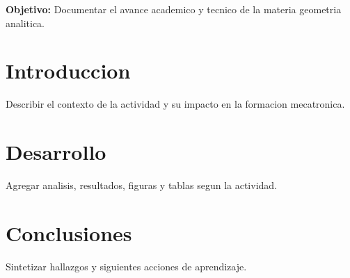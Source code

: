 \documentclass[spanish,letterpaper,oneside]{article}
\begin{document}
\templatePortrait
\templatePagecfg
\onehalfspacing

\begin{abstractd}
\textbf{Objetivo:} Documentar el avance academico y tecnico de la materia geometria analitica.
\end{abstractd}

\templateIndex
\templateFinalcfg

\section{Introduccion}
Describir el contexto de la actividad y su impacto en la formacion mecatronica.

\section{Desarrollo}
Agregar analisis, resultados, figuras y tablas segun la actividad.

\section{Conclusiones}
Sintetizar hallazgos y siguientes acciones de aprendizaje.



\end{document}
